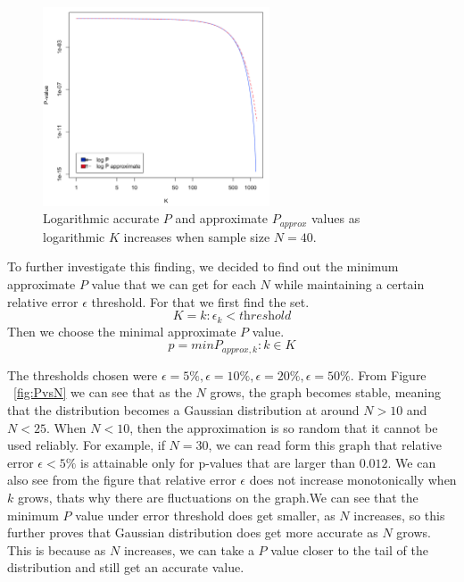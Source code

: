 \documentclass[12pt]{article}
\begin{document}
{\begin{figure}[H]
  \centering
  \includegraphics[width=0.6\textwidth]{logPlogPapproxAsKincreases}
  \caption{Logarithmic accurate $P$ and approximate $P_{approx}$ values as logarithmic $K$ increases when sample size $N=40$.}
  \label{fig:logPlogPapproxAsKincreases}
\end{figure}

To further investigate this finding, we decided to find out the minimum approximate $P$ value that we can get for each $N$ while maintaining a certain relative error $\epsilon$ threshold. For that we first find the set.
\begin{equation}
K={k: \epsilon_k < \textit{threshold}}
\end{equation}
Then we choose the minimal approximate $P$ value.
\begin{equation}
p = min{P_{approx, k}: k \in K}
\end{equation}

The thresholds chosen were $\epsilon=5\%, \epsilon=10\%, \epsilon=20\%, \epsilon=50\%$. From Figure ~\ref{fig:PvsN} we can see that as the $N$ grows, the graph becomes stable, meaning that the distribution becomes a Gaussian distribution at around $N > 10$ and $N < 25$.  When $N < 10$, then the approximation is so random that it cannot be used reliably. For example, if $N=30$, we can read form this graph that relative error $\epsilon<5\%$ is attainable only for p-values that are larger than $0.012$. We can also see from the figure that relative error $\epsilon$ does not increase monotonically when $k$ grows, thats why there are fluctuations on the graph.We can see that the minimum $P$ value under error threshold does get smaller, as $N$ increases, so this further proves that Gaussian distribution does get more accurate as $N$ grows. This is because as $N$ increases, we can take a $P$ value closer to the tail of the distribution and still get an accurate value.

}
\end{document}
